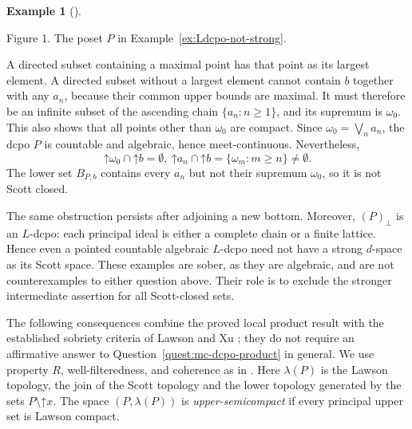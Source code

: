 \documentclass[11pt,reqno]{amsart}
\theoremstyle{definition}
\newtheorem{example}[theorem]{Example}
\theoremstyle{remark}
\numberwithin{equation}{section}
\newcommand{\up}[1]{\mathord{\uparrow}#1}
\begin{document}
\begin{example}[{\cite[Example~58]{LawsonXuLower}}]
\begin{center}

\smallskip
\small Figure 1. The poset $P$ in Example~\ref{ex:Ldcpo-not-strong}.
\end{center}
A directed subset containing a maximal point has that point as its largest element. A directed subset without a largest element cannot contain $b$ together with any $a_n$, because their common upper bounds are maximal. It must therefore be an infinite subset of the ascending chain $\{a_n:n\ge1\}$, and its supremum is $\omega_0$. This also shows that all points other than $\omega_0$ are compact. Since $\omega_0=\bigvee_n a_n$, the dcpo $P$ is countable and algebraic, hence meet-continuous. Nevertheless,
\[
 \up\omega_0\cap\up b=\emptyset,
 ~
 \up a_n\cap\up b=\{\omega_m:m\ge n\}\ne\emptyset.
\]
The lower set $B_{P,b}$ contains every $a_n$ but not their supremum $\omega_0$, so it is not Scott closed.

The same obstruction persists after adjoining a new bottom. Moreover, $(P)_\bot$ is an $L$-dcpo: each principal ideal is either a complete chain or a finite lattice. Hence even a pointed countable algebraic $L$-dcpo need not have a strong $d$-space as its Scott space. These examples are sober, as they are algebraic, and are not counterexamples to either question above. Their role is to exclude the stronger intermediate assertion for all Scott-closed sets.
\end{example}

The following consequences combine the proved local product result with the established sobriety criteria of Lawson and Xu \cite{LawsonXu,LawsonXuLower}; they do not require an affirmative answer to Question~\ref{quest:mc-dcpo-product} in general. We use property $R$, well-filteredness, and coherence as in \cite[Sections~2 and~3]{LawsonXuLower}. Here $\lambda(P)$ is the Lawson topology, the join of the Scott topology and the lower topology generated by the sets $P\setminus\up x$. The space $(P,\lambda(P))$ is \emph{upper-semicompact} if every principal upper set is Lawson compact.
\end{document}

